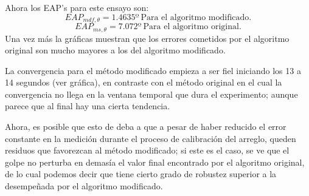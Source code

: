 \documentclass[conference]{IEEEtran}
\begin{document}
Ahora los EAP's para este ensayo son:
\begin{equation*}
EAP_{mdf,\theta}=1.4635º~\text{Para el algoritmo modificado.}
\end{equation*}
\begin{equation*}
EAP_{ms,\theta}=7.072º~\text{Para el algoritmo original.}
\end{equation*}
Una vez más la gráficas muestran que los errores cometidos por el algoritmo original son mucho mayores a los del algoritmo modificado.\par
La convergencia para el método modificado empieza a ser fiel iniciando los 13 a 14 segundos (ver gráfica), en contraste con el método original en el cual la convergencia no llega en la ventana temporal que dura el experimento; aunque parece que al final hay una cierta tendencia. \par
Ahora, es posible que esto de deba a que a pesar de haber reducido el error constante en la medición durante el proceso de calibración del arreglo, queden residuos que favorezcan al método modificado; si este es el caso, se ve que el golpe no perturba en demasía el valor final encontrado por el algoritmo original, de lo cual podemos decir que tiene cierto grado de robustez superior a la desempeñada por el algoritmo modificado.\par 
\end{document}
